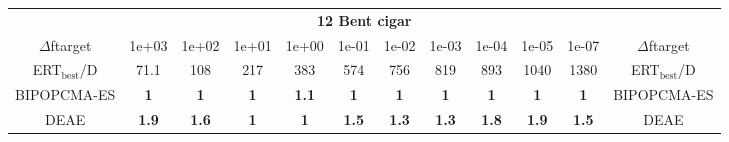 \begin{tabular}{cccccccccccc}
 & \multicolumn{10}{c}{{\normalsize \textbf{12 Bent cigar}}}\\
$\Delta$ftarget& 1e+03& 1e+02& 1e+01& 1e+00& 1e-01& 1e-02& 1e-03& 1e-04& 1e-05& 1e-07 & $\Delta$ftarget \\
ERT$_{\textrm{best}}$/D& 71.1& 108& 217& 383& 574& 756& 819& 893& 1040& 1380 & ERT$_{\textrm{best}}$/D \\
\hline
BIPOPCMA-ES & \textbf{1} & \textbf{1} & \textbf{1} & \textbf{1.1} & \textbf{1} & \textbf{1} & \textbf{1} & \textbf{1} & \textbf{1} & \textbf{1} & BIPOPCMA-ES \cite{add_an_entry_for_BIPOPCMA-ES_in_bbob.bib}\\
DEAE & \textbf{1.9} & \textbf{1.6} & \textbf{1} & \textbf{1} & \textbf{1.5} & \textbf{1.3} & \textbf{1.3} & \textbf{1.8} & \textbf{1.9} & \textbf{1.5} & DEAE \cite{add_an_entry_for_DEAE_in_bbob.bib}
\end{tabular}
